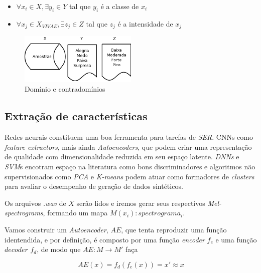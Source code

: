 \begin{itemize}
    \item $\forall x_i \in X, \exists y_i \in Y$ tal que  $y_i$ é a classe de $x_i$
    \item $\forall x_j \in X_{VIVAE}, \exists z_j \in Z$ tal que  $z_j$ é a intensidade de $x_j$
\end{itemize}

\begin{figure}[!h]
\centering
\includegraphics[width=0.5\textwidth]{imagens/p-dominios-contradominos.png}
\caption{\label{fig:dominioscontradominios}Domínio e contradomínios}
\end{figure}

\subsection{Extração de características}

Redes neurais constituem uma boa ferramenta para tarefas de \textit{SER}. CNNs como \textit{feature extractors}, mais ainda \textit{Autoencoders}, que podem criar uma representação de qualidade com dimensionalidade reduzida em seu espaço latente. \textit{DNNs} e \textit{SVM}s encotram espaço na literatura como bons discriminadores e algoritmos não supervisionados como \textit{PCA} e \textit{K-means} podem atuar como formadores de \textit{clusters} para avaliar o desempenho de geração de dados sintéticos.

Os arquivos \textit{.wav} de $X$ serão lidos e iremos gerar seus respectivos \textit{Mel-spectrograms}, formando um mapa $M(x_i): spectrograma_i$.

Vamos construir um \textit{Autoencoder}, $AE$, que tenta reproduzir uma função identendida, e por definição, é composto por uma função \textit{encoder} $f_e$ e uma função $decoder$ $f_d$, de modo que $AE: M \rightarrow M'$ faça

\begin{equation}
    AE(x) = f_d(f_e(x)) = x' \approx x
\end{equation}

